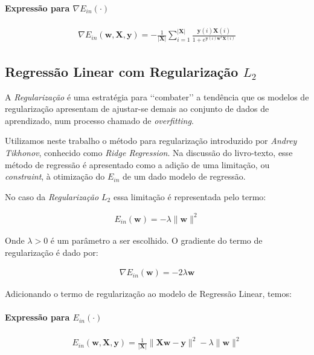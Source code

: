 \documentclass[a4paper, 12pt]{article}
\begin{document}
\paragraph{Expressão para $\nabla{}E_{in}(\cdot)$}

\begin{align*}
    \nabla{}E_{in}(\textbf{w}, \textbf{X}, \textbf{y}) = -\frac{1}{|\textbf{X}|} \sum^{|\textbf{X}|}_{i=1}{\frac{\textbf{y}(i)\textbf{X}(i)}{1 + e^{\textbf{y}(i)\textbf{w}^{T}\textbf{X}(i)}}}
\end{align*}

\subsection{Regressão Linear com Regularização $L_2$}

A \textit{Regularização} é uma estratégia para \lq\lq{}combater\rq\rq{} a
tendência que os modelos de regularização apresentam de ajustar-se demais ao
conjunto de dados de aprendizado, num processo chamado de \textit{overfitting}.

Utilizamos neste trabalho o método para regularização introduzido por
\textit{Andrey Tikhonov}, conhecido como \textit{Ridge Regression}.
Na discussão do livro-texto, esse método de regressão é apresentado
como a adição de uma limitação, ou \textit{constraint}, à otimização
do $E_{in}$ de um dado modelo de regressão.

No caso da \textit{Regularização $L_2$} essa limitação é representada pelo termo:

\begin{align*}
    E_{in}(\textbf{w}) = -\lambda\|\textbf{w}\|^{2}
\end{align*}

Onde $\lambda > 0$ é um parâmetro a ser escolhido. O gradiente do termo
de regularização é dado por:

\begin{align*}
    \nabla{}E_{in}(\textbf{w}) = -2\lambda{}\textbf{w}
\end{align*}

Adicionando o termo de regularização ao modelo de Regressão Linear, temos:

\paragraph{Expressão para $E_{in}(\cdot)$}

\begin{align*}
    E_{in}(\textbf{w}, \textbf{X}, \textbf{y}) = \frac{1}{|\textbf{X}|} \|\textbf{Xw} - \textbf{y}\|^{2} - \lambda\|\textbf{w}\|^{2}
\end{align*}
\end{document}
